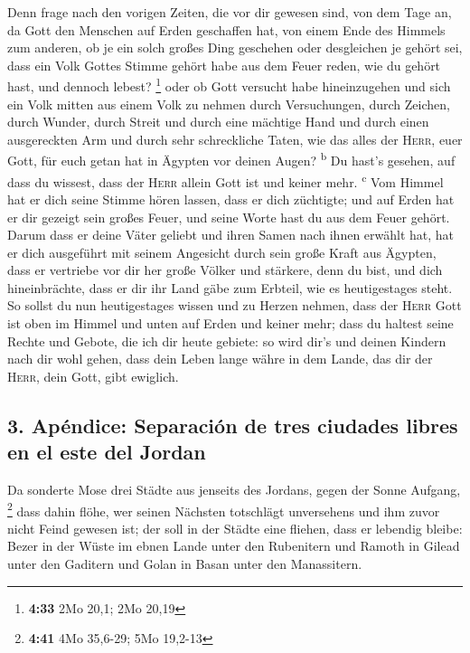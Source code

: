  Denn frage nach den vorigen Zeiten, die vor dir gewesen
sind, von dem Tage an, da Gott den Menschen auf Erden geschaffen hat,
von einem Ende des Himmels zum anderen, ob je ein solch großes Ding
geschehen oder desgleichen je gehört sei,  dass ein Volk
Gottes Stimme gehört habe aus dem Feuer reden, wie du gehört hast, und
dennoch lebest? \footnote{\textbf{4:33} 2Mo 20,1; 2Mo 20,19}
 oder ob Gott versucht habe hineinzugehen und sich ein
Volk mitten aus einem Volk zu nehmen durch Versuchungen, durch Zeichen,
durch Wunder, durch Streit und durch eine mächtige Hand und durch einen
ausgereckten Arm und durch sehr schreckliche Taten, wie das alles der
\textsc{Herr}, euer Gott, für euch getan hat in Ägypten vor deinen
Augen? \textsuperscript{b}  Du hast's gesehen, auf dass
du wissest, dass der \textsc{Herr} allein Gott ist und keiner mehr.
\textsuperscript{c}  Vom Himmel hat er dich seine Stimme
hören lassen, dass er dich züchtigte; und auf Erden hat er dir gezeigt
sein großes Feuer, und seine Worte hast du aus dem Feuer gehört.
 Darum dass er deine Väter geliebt und ihren Samen nach
ihnen erwählt hat, hat er dich ausgeführt mit seinem Angesicht durch
sein große Kraft aus Ägypten,  dass er vertriebe vor dir
her große Völker und stärkere, denn du bist, und dich hineinbrächte,
dass er dir ihr Land gäbe zum Erbteil, wie es heutigestages steht.
 So sollst du nun heutigestages wissen und zu Herzen
nehmen, dass der \textsc{Herr} Gott ist oben im Himmel und unten auf
Erden und keiner mehr;  dass du haltest seine Rechte und
Gebote, die ich dir heute gebiete: so wird dir's und deinen Kindern nach
dir wohl gehen, dass dein Leben lange währe in dem Lande, das dir der
\textsc{Herr}, dein Gott, gibt ewiglich.

\hypertarget{apuxe9ndice-separaciuxf3n-de-tres-ciudades-libres-en-el-este-del-jordan}{%
\subsection{3. Apéndice: Separación de tres ciudades libres en el este
del
Jordan}\label{apuxe9ndice-separaciuxf3n-de-tres-ciudades-libres-en-el-este-del-jordan}}

 Da sonderte Mose drei Städte aus jenseits des Jordans,
gegen der Sonne Aufgang, \footnote{\textbf{4:41} 4Mo 35,6-29; 5Mo
  19,2-13}  dass dahin flöhe, wer seinen Nächsten
totschlägt unversehens und ihm zuvor nicht Feind gewesen ist; der soll
in der Städte eine fliehen, dass er lebendig bleibe: 
Bezer in der Wüste im ebnen Lande unter den Rubenitern und Ramoth in
Gilead unter den Gaditern und Golan in Basan unter den Manassitern.

